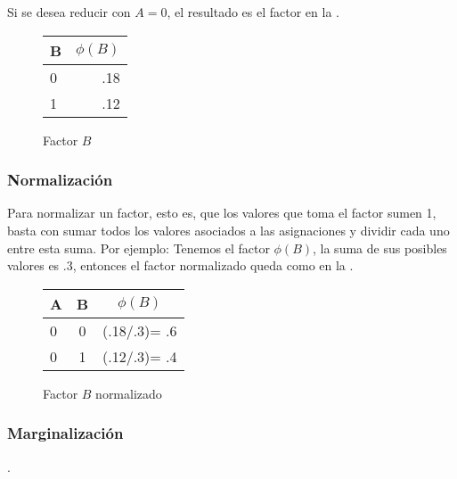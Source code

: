 \noindent Si se desea reducir con $A = 0$, el resultado es el factor en la .

\begin{figure}[h]
  \begin{center}
    \begin{tabular}{ l | r }
      B & \(\phi(B)\)\\ \hline
      0 & .18  \\ \hline
      1 & .12  \\
    \end{tabular}
  \end{center}
  \caption{Factor \(B\)}
  \label{fig:FactorA0B}
\end{figure}

\subsubsection{Normalización}
Para normalizar un factor, esto es, que los valores que toma el factor sumen 1, basta con sumar todos los valores asociados a las asignaciones y dividir cada uno entre esta suma. Por ejemplo: Tenemos el factor \(\phi(B)\), la suma de sus posibles valores es .3, entonces el factor normalizado queda como en la .

\begin{figure}[H]
  \begin{center}
    \begin{tabular}{ l  c | c }
      A & B &  \(\phi(B)\)\\ \hline
      0 & 0 & (.18/.3)= .6  \\ \hline
      0 & 1 & (.12/.3)= .4 \\
    \end{tabular}
  \end{center}
  \caption{Factor \(B\) normalizado}
  \label{fig:FactorA0BNorm}
\end{figure}


\subsubsection{Marginalización}
 \parencite[297]{KollerFriedman2009}.

